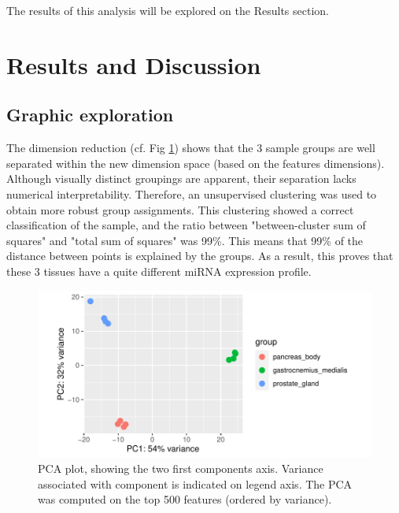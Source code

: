 \documentclass[a4paper, 11pt]{article}
\begin{document}
\begin{multicols}{2}
The results of this analysis will be explored on the Results section.



\section{Results and Discussion}

\subsection{Graphic exploration}

The dimension reduction (cf. Fig \ref{fig:pca}) shows that the 3 sample groups are well separated within the new dimension space (based on the features dimensions). Although visually distinct groupings are apparent, their separation lacks numerical interpretability. Therefore, an unsupervised clustering was used to obtain more robust group assignments. This clustering showed a correct classification of the sample, and the ratio between "between-cluster sum of squares" and  "total sum of squares" was 99\%. This means that 99\% of the distance between points is explained by the groups. As a result, this proves that these 3 tissues have a quite different miRNA expression profile.

\begin{figure}[H]
	\centering
	\includegraphics[width=\columnwidth]{Figures/differential_analysis/pca.pdf}
	\caption{\footnotesize{PCA plot, showing the two first components axis. Variance associated with component is indicated on legend axis. The PCA was computed on the top 500 features (ordered by variance).}}
	\label{fig:pca}
\end{figure}



\end{multicols}
\end{document}
